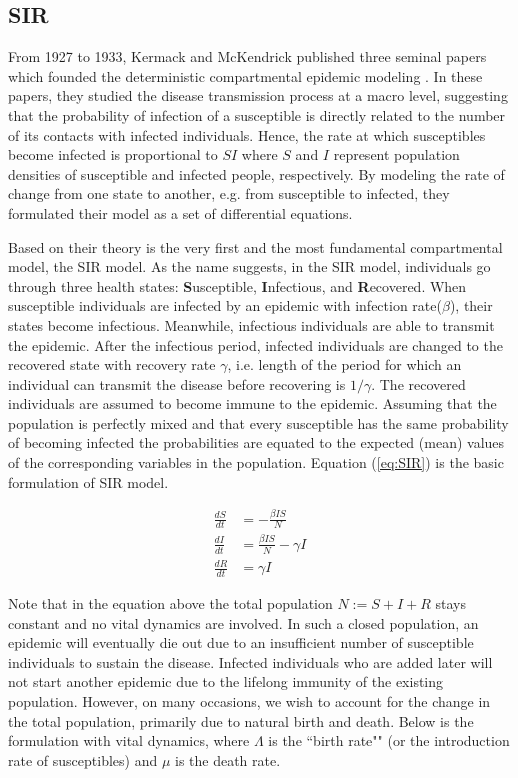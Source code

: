 \documentclass[8pt,twocolumn]{extarticle}
\begin{document}
\subsection{SIR} %
From 1927 to 1933, Kermack and McKendrick published three seminal papers which founded the deterministic compartmental epidemic modeling \cite{KM1927,KM1932,KM1933}. In these papers, they studied the disease transmission process at a macro level, suggesting that the probability of infection of a susceptible is directly related to the number of its contacts with infected individuals. Hence, the rate at which susceptibles become infected is proportional to $SI$ where $S$ and $I$ represent population densities of susceptible and infected people, respectively. By modeling the rate of change from one state to another, e.g. from susceptible to infected, they formulated their model as a set of differential equations.

Based on their theory is the very first and the most fundamental compartmental model, the SIR model. As the name suggests, in the SIR model, individuals go through three health states: \textbf{S}usceptible, \textbf{I}nfectious, and \textbf{R}ecovered. When susceptible individuals are infected by an epidemic with infection rate($\beta$), their states become infectious. Meanwhile, infectious individuals are able to transmit the epidemic. After the infectious period, infected individuals are changed to the recovered state with recovery rate $\gamma$, i.e. length of the period for which an individual can transmit the disease before recovering is $1/\gamma$. The recovered individuals are assumed to become immune to the epidemic. Assuming that the population is perfectly mixed and that every susceptible has the same probability of becoming infected the probabilities are equated to the expected (mean) values of the corresponding variables in the population. Equation (\ref{eq:SIR}) is the basic formulation of SIR model.

\begin{align}
\frac{dS}{dt} & =-\frac{\beta IS}{N} \nonumber \\
\frac{dI}{dt} & = \frac{\beta IS}{N} - \gamma I \nonumber \\
\frac{dR}{dt} & = \gamma I \label{eq:SIR}
\end{align}

Note that in the equation above the total population $N:=S+I+R$ stays constant and no vital dynamics are involved. In such a closed population, an epidemic will eventually die out due to an insufficient number of susceptible individuals to sustain the disease. Infected individuals who are added later will not start another epidemic due to the lifelong immunity of the existing population. However, on many occasions, we wish to account for the change in the total population, primarily due to natural birth and death. Below is the formulation with vital dynamics, where $\Lambda$ is the ``birth rate"" (or the introduction rate of susceptibles) and $\mu$ is the death rate.
\end{document}
